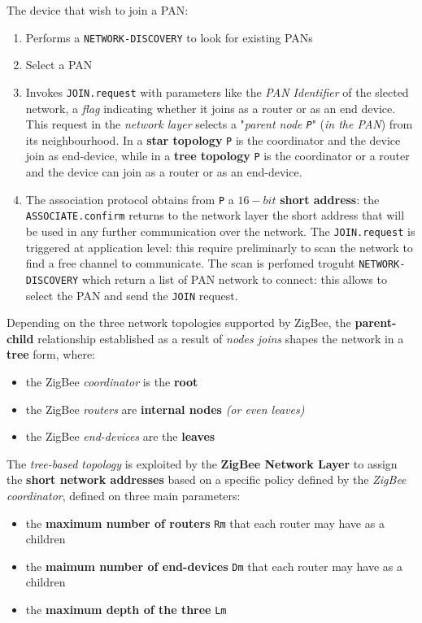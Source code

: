 \documentclass[10pt,a4paper]{report}
\theoremstyle{definition}
\begin{document}
The device that wish to join a PAN:
\begin{enumerate}
	\item 
	Performs a \texttt{NETWORK-DISCOVERY} to look for existing PANs
	\item 
	Select a PAN
	\item 
	Invokes \texttt{JOIN.request} with parameters like the \textit{PAN Identifier} of the slected network, a \textit{flag} indicating whether it joins as a router or as an end device. This request in the \textit{network layer} selects a "\textit{parent node \texttt{P}}" (\textit{in the PAN}) from its neighbourhood. In a \textbf{star topology} \texttt{P} is the coordinator and the device join as end-device, while in a \textbf{tree topology} \texttt{P} is the coordinator or a router and the device can join as a router or as an end-device.
	\item 
	The association protocol obtains from \texttt{P} a $16-bit$ \textbf{short address}: the \texttt{ASSOCIATE.confirm} returns to the network layer the short address that will be used in any further communication over the network.
	The \texttt{JOIN.request} is triggered at application level: this require preliminarly to scan the network to find a free channel to communicate. The scan is perfomed troguht \texttt{NETWORK-DISCOVERY} which return a list of PAN network to connect: this allows to select the PAN and send the \texttt{JOIN} request.

\end{enumerate}
	Depending on the three network topologies supported by ZigBee, the \textbf{parent-child} relationship established as a result of \textit{nodes joins} shapes the network in a \textbf{tree} form, where:
	\begin{itemize}
		\item the ZigBee \textit{coordinator} is the \textbf{root}
		\item the ZigBee \textit{routers} are \textbf{internal nodes} \textit{(or even leaves)}
		\item the ZigBee \textit{end-devices} are the \textbf{leaves}
	\end{itemize}
	The \textit{tree-based topology} is exploited by the \textbf{ZigBee Network Layer} to assign the \textbf{short network addresses} based on a specific policy defined by the \textit{ZigBee coordinator}, defined on three main parameters:
	\begin{itemize}
		\item the \textbf{maximum number of routers} \texttt{Rm} that each router may have as a children
		\item the \textbf{maimum number of end-devices} \texttt{Dm} that each router may have as a children
		\item the \textbf{maximum depth of the three} \texttt{Lm}
	\end{itemize}
\end{document}
